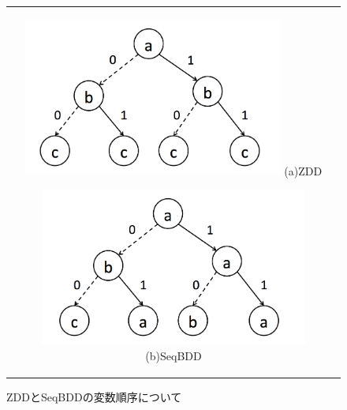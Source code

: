 \documentclass[12pt,twoside, fleqn]{ujbook}
\begin{document}
	\begin{figure}[htbp]
	\begin{center}
	\begin{tabular}{c}
		\begin{minipage}{0.5\hsize}
			\begin{center}
			\includegraphics [clip, height=5.2cm]{./img/zdd_num.png}
			\hspace{1.6cm} (a)ZDD
			\end{center}
		\end{minipage}

		\begin{minipage}{0.5\hsize}
			\begin{center}
			\includegraphics [clip, height=5.2cm]{./img/seqbdd_num.png}
			\hspace{1.6cm} (b)SeqBDD
			\end{center}
		\end{minipage}
	\end{tabular}
	\caption{ZDDとSeqBDDの変数順序について}
	\label{fig:zdd-seqbdd}
	\end{center}
	\end{figure}
\end{document}
